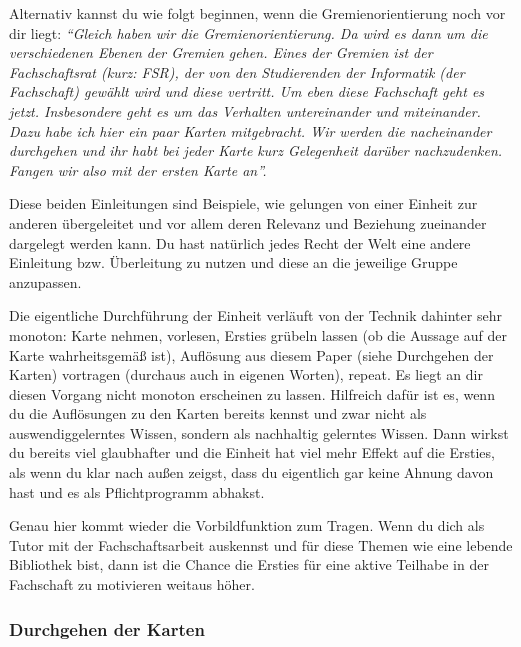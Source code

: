 \documentclass[a4paper,11pt]{scrartcl} %
\begin{document}
Alternativ kannst du wie folgt beginnen, wenn die Gremienorientierung noch vor dir liegt: \textit{"`Gleich haben wir die Gremienorientierung. Da wird es dann um die verschiedenen Ebenen der Gremien gehen. Eines der Gremien ist der Fachschaftsrat (kurz: FSR), der von den Studierenden der Informatik (der Fachschaft) gewählt wird und diese vertritt. Um eben diese Fachschaft geht es jetzt.
Insbesondere geht es um das Verhalten untereinander und miteinander. Dazu habe ich hier ein paar Karten mitgebracht. Wir werden die nacheinander durchgehen und ihr habt bei jeder Karte kurz Gelegenheit darüber nachzudenken. Fangen wir also mit der ersten Karte an"'.}

Diese beiden Einleitungen sind Beispiele, wie gelungen von einer Einheit zur anderen übergeleitet und vor allem deren Relevanz und Beziehung zueinander dargelegt werden kann. Du hast natürlich jedes Recht der Welt eine andere Einleitung bzw. Überleitung zu nutzen und diese an die jeweilige Gruppe anzupassen.

Die eigentliche Durchführung der Einheit verläuft von der Technik dahinter sehr monoton: Karte nehmen, vorlesen, Ersties grübeln lassen (ob die Aussage auf der Karte wahrheitsgemäß ist), Auflösung aus diesem Paper (siehe Durchgehen der Karten) vortragen (durchaus auch in eigenen Worten), repeat.
Es liegt an dir diesen Vorgang nicht monoton erscheinen zu lassen. Hilfreich dafür ist es, wenn du die Auflösungen zu den Karten bereits kennst und zwar nicht als auswendiggelerntes Wissen, sondern als nachhaltig gelerntes Wissen. Dann wirkst du bereits viel glaubhafter und die Einheit hat viel mehr Effekt auf die Ersties, als wenn du klar nach außen zeigst, dass du eigentlich gar keine Ahnung davon hast und es als Pflichtprogramm abhakst.

Genau hier kommt wieder die Vorbildfunktion zum Tragen. Wenn du dich als Tutor mit der Fachschaftsarbeit auskennst und für diese Themen wie eine lebende Bibliothek bist, dann ist die Chance die Ersties für eine aktive Teilhabe in der Fachschaft zu motivieren weitaus höher.

	\subsubsection{Durchgehen der Karten}
	
\end{document}
